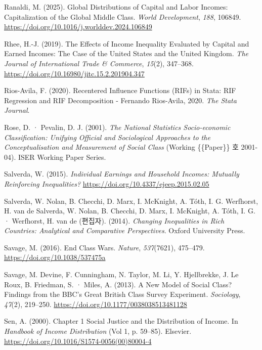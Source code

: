 \documentclass[
  letterpaper,
  DIV=11,
  numbers=noendperiod]{scrartcl}
\newlength{\cslhangindent}
\newenvironment{CSLReferences}[2] %
 {\begin{list}{}{%
  \setlength{\itemindent}{0pt}
  \setlength{\leftmargin}{0pt}
  \setlength{\parsep}{0pt}
  \ifodd #1
   \setlength{\leftmargin}{\cslhangindent}
   \setlength{\itemindent}{-1\cslhangindent}
  \fi
  \setlength{\itemsep}{#2\baselineskip}}}
 {\end{list}}
\begin{document}
\begin{CSLReferences}{1}{0}
Ranaldi, M. (2025). Global {Distributions} of {Capital} and {Labor
Incomes}: {Capitalization} of the {Global Middle Class}. \emph{World
Development}, \emph{188}, 106849.
\url{https://doi.org/10.1016/j.worlddev.2024.106849}

Rhee, H.-J. (2019). {The Effects of Income Inequality Evaluated by
Capital and Earned Incomes: The Case of the United States and the United
Kingdom}. \emph{The Journal of International Trade \& Commerce},
\emph{15}(2), 347--368.
\url{https://doi.org/10.16980/jitc.15.2.201904.347}

Rios-Avila, F. (2020). Recentered Influence Functions ({RIFs}) in
{Stata}: {RIF} Regression and {RIF} Decomposition - {Fernando
Rios-Avila}, 2020. \emph{The Stata Journal}.

Rose, D. · Pevalin, D. J. (2001). \emph{The {National Statistics
Socio-economic Classification}: Unifying Official and Sociological
Approaches to the Conceptualisation and Measurement of Social Class}
(Working \{\{Paper\}\} 호 2001-04). ISER Working Paper Series.

Salverda, W. (2015). \emph{Individual Earnings and Household Incomes:
Mutually Reinforcing Inequalities?}
\url{https://doi.org/10.4337/ejeep.2015.02.05}

Salverda, W. Nolan, B. Checchi, D. Marx, I. McKnight, A. Tóth, I. G.
Werfhorst, H. van de Salverda, W. Nolan, B. Checchi, D. Marx, I.
McKnight, A. Tóth, I. G. · Werfhorst, H. van de (편집자). (2014).
\emph{Changing {Inequalities} in {Rich Countries}: {Analytical} and
{Comparative Perspectives}}. Oxford University Press.

Savage, M. (2016). End Class Wars. \emph{Nature}, \emph{537}(7621),
475--479. \url{https://doi.org/10.1038/537475a}

Savage, M. Devine, F. Cunningham, N. Taylor, M. Li, Y. Hjellbrekke, J.
Le Roux, B. Friedman, S. · Miles, A. (2013). A {New Model} of {Social
Class}? {Findings} from the {BBC}'s {Great British Class} {Survey
Experiment}. \emph{Sociology}, \emph{47}(2), 219--250.
\url{https://doi.org/10.1177/0038038513481128}

Sen, A. (2000). Chapter 1 {Social} Justice and the Distribution of
Income. In \emph{Handbook of {Income Distribution}} (Vol 1, p. 59--85).
Elsevier. \url{https://doi.org/10.1016/S1574-0056(00)80004-4}


\end{CSLReferences}
\end{document}
